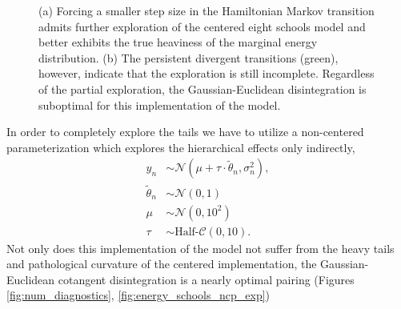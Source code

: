 \documentclass[stslayout]{imsart}
\begin{document}
\begin{figure}
\centering
{}
\caption{(a) Forcing a smaller step size in the Hamiltonian Markov transition 
admits further exploration of the centered eight schools model and better
exhibits the true heaviness of the marginal energy distribution.  (b) The
persistent divergent transitions (green), however, indicate that the exploration 
is still incomplete.  Regardless of the partial exploration, the 
Gaussian-Euclidean disintegration is suboptimal for this implementation of
the model.}
\label{fig:energy_schools_cp_99_exp}
\end{figure}

In order to completely explore the tails we have to utilize a non-centered
parameterization which explores the hierarchical effects only indirectly,
%
\begin{align*}
y_{n} &\sim 
\mathcal{N} \! \left( \mu + \tau \cdot \tilde{\theta}_{n}, \sigma_{n}^{2} \right),
\\
\tilde{\theta}_{n} &\sim \mathcal{N} \! \left( 0, 1 \right)
\\
\mu &\sim \mathcal{N} \! \left( 0, 10^{2} \right)
\\
\tau &\sim \text{Half-}\mathcal{C} \! \left( 0, 10 \right).
\end{align*}
%
Not only does this implementation of the model not suffer from the
heavy tails and pathological curvature of the centered implementation,
the Gaussian-Euclidean cotangent disintegration is a nearly optimal
pairing (Figures \ref{fig:num_diagnostics}, \ref{fig:energy_schools_ncp_exp})
\end{document}
